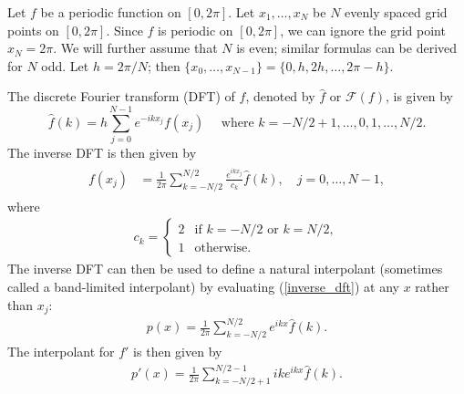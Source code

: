 \label{lab:pseudospectral2}


Let $f$ be a periodic function on $[0,2\pi]$. Let $x_1,\ldots,x_N$ be $N$ evenly spaced grid points on $[0,2\pi].$ Since $f$ is periodic on $[0,2\pi]$, we can ignore the grid point $x_N = 2\pi$. We will further assume that $N$ is even; similar formulas can be derived for $N$ odd. Let $h = 2\pi/N$; then $\{x_0,\ldots,x_{N-1}\} = \{0,h,2h,\ldots,2\pi-h\}$.  

The discrete Fourier transform (DFT) of $f$, denoted by $\hat{f}$ or $\mathcal{F}(f)$, is given by
\[
\hat{f}(k) = h \sum_{j=0}^{N-1} e^{-ikx_j}f(x_j) \quad \text{ where } k = -N/2+1, \ldots,0,1,\ldots, N/2.
\]
The inverse DFT is then given by
\begin{align}
\begin{split}
f(x_j) &= \frac{1}{2\pi}\sum_{k=-N/2}^{N/2}\frac{e^{ikx_j}}{c_k}\hat{f}(k), \quad j = 0,\ldots, N-1,
\end{split}\label{inverse_dft}
\end{align}
where %
\begin{align}
	c_k = \begin{cases} 2 & \text{if }k = -N/2 \text{ or }k = N/2, \\ 1 &  \text{otherwise.}
\end{cases}
\end{align}
The inverse DFT can then be used to define a natural interpolant (sometimes called a band-limited interpolant) by evaluating (\ref{inverse_dft}) at any $x$ rather than $x_j$:
\begin{align}
p(x) = \frac{1}{2\pi}\sum_{k=-N/2}^{N/2} e^{ikx}\hat{f}(k). \label{interpolant}
\end{align}
The interpolant for $f'$ is then given by 
\begin{align}
p'(x) = \frac{1}{2\pi}\sum_{k=-N/2+1}^{N/2-1} ike^{ikx}\hat{f}(k). \label{spectral2:deriv}
\end{align}


